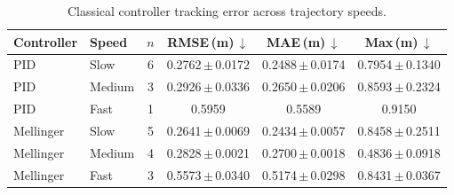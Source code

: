 \begin{table}[t]
\caption{Classical controller tracking error across trajectory speeds.}
\label{tab:task2_speed}
\centering
\begin{tabular}{llcccc}
\toprule
Controller & Speed & $n$ & RMSE\,(m)\,$\downarrow$ & MAE\,(m)\,$\downarrow$ & Max\,(m)\,$\downarrow$ \\
\midrule
PID & Slow & 6 & 0.2762\,{\scriptsize$\pm$\,0.0172} & 0.2488\,{\scriptsize$\pm$\,0.0174} & 0.7954\,{\scriptsize$\pm$\,0.1340} \\
PID & Medium & 3 & 0.2926\,{\scriptsize$\pm$\,0.0336} & 0.2650\,{\scriptsize$\pm$\,0.0206} & 0.8593\,{\scriptsize$\pm$\,0.2324} \\
PID & Fast & 1 & 0.5959 & 0.5589 & 0.9150 \\
\midrule
Mellinger & Slow & 5 & 0.2641\,{\scriptsize$\pm$\,0.0069} & 0.2434\,{\scriptsize$\pm$\,0.0057} & 0.8458\,{\scriptsize$\pm$\,0.2511} \\
Mellinger & Medium & 4 & 0.2828\,{\scriptsize$\pm$\,0.0021} & 0.2700\,{\scriptsize$\pm$\,0.0018} & 0.4836\,{\scriptsize$\pm$\,0.0918} \\
Mellinger & Fast & 3 & 0.5573\,{\scriptsize$\pm$\,0.0340} & 0.5174\,{\scriptsize$\pm$\,0.0298} & 0.8431\,{\scriptsize$\pm$\,0.0367} \\
\bottomrule
\end{tabular}
\end{table}